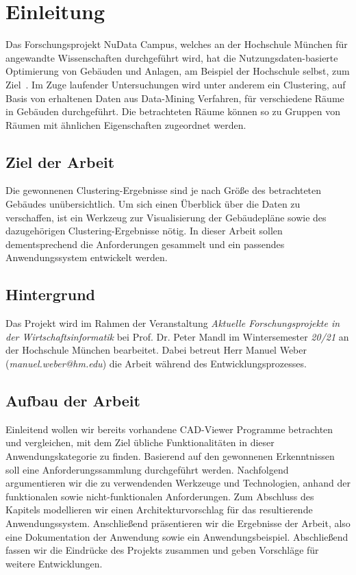 \section{Einleitung}
\label{sec:introduction}

Das Forschungsprojekt \glqq{}NuData Campus\grqq{}, welches an der Hochschule München für angewandte Wissenschaften durchgeführt wird, hat die Nutzungsdaten-basierte Optimierung von Gebäuden und Anlagen, am Beispiel der Hochschule selbst, zum Ziel~\cite{NuDataCampus}.
Im Zuge laufender Untersuchungen wird unter anderem ein Clustering, auf Basis von erhaltenen Daten aus Data-Mining Verfahren, für verschiedene Räume in Gebäuden durchgeführt.
Die betrachteten Räume können so zu Gruppen von Räumen mit ähnlichen Eigenschaften zugeordnet werden.

\subsection{Ziel der Arbeit}
\label{subsec:purpose}

Die gewonnenen Clustering-Ergebnisse sind je nach Größe des betrachteten Gebäudes unübersichtlich.
Um sich einen Überblick über die Daten zu verschaffen, ist ein Werkzeug zur Visualisierung der Gebäudepläne sowie des dazugehörigen Clustering-Ergebnisse nötig.
In dieser Arbeit sollen dementsprechend die Anforderungen gesammelt und ein passendes Anwendungssystem entwickelt werden.

\subsection{Hintergrund}
\label{subsec:background}

Das Projekt wird im Rahmen der Veranstaltung \textit{\glqq{}Aktuelle Forschungsprojekte in der Wirtschaftsinformatik\grqq{}} bei Prof. Dr. Peter Mandl im Wintersemester \textit{20/21} an der Hochschule München bearbeitet.
Dabei betreut Herr Manuel Weber (\textit{manuel.weber@hm.edu}) die Arbeit während des Entwicklungsprozesses.

\subsection{Aufbau der Arbeit}
\label{subsec:structure}

Einleitend wollen wir bereits vorhandene CAD-Viewer Programme betrachten und vergleichen, mit dem Ziel übliche Funktionalitäten in dieser Anwendungskategorie zu finden.
Basierend auf den gewonnenen Erkenntnissen soll eine Anforderungssammlung durchgeführt werden.
Nachfolgend argumentieren wir die zu verwendenden Werkzeuge und Technologien, anhand der funktionalen sowie nicht-funktionalen Anforderungen.
Zum Abschluss des Kapitels modellieren wir einen Architekturvorschlag für das resultierende Anwendungssystem.
Anschließend präsentieren wir die Ergebnisse der Arbeit, also eine Dokumentation der Anwendung sowie ein Anwendungsbeispiel.
Abschließend fassen wir die Eindrücke des Projekts zusammen und geben Vorschläge für weitere Entwicklungen.
